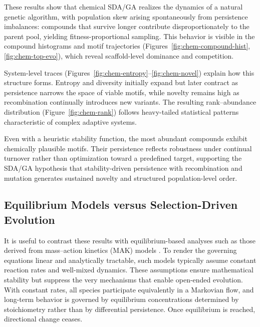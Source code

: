 \documentclass{artificial-life}
\let\cite\citep
\begin{document}
These results show that chemical SDA/GA realizes the dynamics of a natural genetic algorithm, with population skew arising spontaneously from persistence imbalances: compounds that survive longer contribute disproportionately to the parent pool, yielding fitness-proportional sampling. This behavior is visible in the compound histograms and motif trajectories (Figures~\ref{fig:chem-compound-hist}, \ref{fig:chem-top-evo}), which reveal scaffold-level dominance and competition.

System-level traces (Figures~\ref{fig:chem-entropy}--\ref{fig:chem-novel}) explain how this structure forms. Entropy and diversity initially expand but later contract as persistence narrows the space of viable motifs, while novelty remains high as recombination continually introduces new variants. The resulting rank–abundance distribution (Figure~\ref{fig:chem-rank}) follows heavy-tailed statistical patterns characteristic of complex adaptive systems.

Even with a heuristic stability function, the most abundant compounds exhibit chemically plausible motifs. Their persistence reflects robustness under continual turnover rather than optimization toward a predefined target, supporting the SDA/GA hypothesis that stability-driven persistence with recombination and mutation generates sustained novelty and structured population-level order.


\subsection{Equilibrium Models versus Selection-Driven Evolution}

It is useful to contrast these results with equilibrium-based analyses such as those derived from mass–action kinetics (MAK) models \cite{fogler1999chemical,TuranyiTomlin2014}. To render the governing equations linear and analytically tractable, such models typically assume constant reaction rates and well-mixed dynamics. These assumptions ensure mathematical stability but suppress the very mechanisms that enable open-ended evolution. With constant rates, all species participate equivalently in a Markovian flow, and long-term behavior is governed by equilibrium concentrations determined by stoichiometry rather than by differential persistence. Once equilibrium is reached, directional change ceases.
\end{document}
